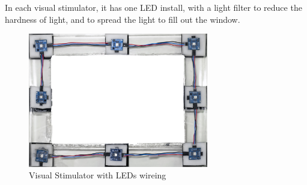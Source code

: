 In each visual stimulator, it has one LED install, with a light filter to reduce the hardness of light, and to spread the light to fill out the window.
\begin{figure}[H]
	\centering
	\includegraphics[width=0.7\textwidth]{chapter6/frame_LED.jpg}
	\caption{Visual Stimulator with LEDs wireing}
\end{figure}

